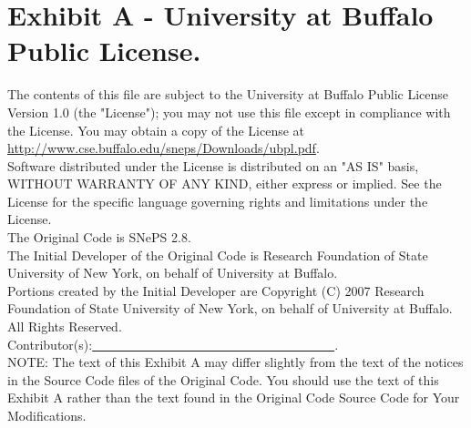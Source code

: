 \documentclass{book}
\begin{document}
\section*{Exhibit A - University at Buffalo Public License.}
The contents of this file are subject to the University at Buffalo
Public License Version 1.0 (the "License"); you may not use this
file except in compliance with the License. You may obtain a copy of
the License at \url{http://www.cse.buffalo.edu/sneps/Downloads/ubpl.pdf}.\\

\noindent Software distributed under the License is distributed on an "AS IS"
basis, WITHOUT WARRANTY OF ANY KIND, either express or implied. See the
License for the specific language governing rights and limitations
under the License.\\

\noindent The Original Code is SNePS 2.8.\\

\noindent The Initial Developer of the Original Code is Research Foundation of State University of New York, on behalf of University at Buffalo.\\

\noindent Portions created by the Initial Developer are Copyright (C) 2007 Research Foundation of State University of New York, on behalf of University at Buffalo. All Rights Reserved.\\

\noindent Contributor(s):\underline{~~~~~~~~~~~~~~~~~~~~~~~~~~~~~~~~~~~~~~}.\\

\noindent NOTE: The text of this Exhibit A may differ slightly from the text of the notices in the Source Code files of the Original Code. You should use the text of this Exhibit A rather than the text found in the Original Code Source Code for Your Modifications.

\clearpage
{}
\printindex
\end{document}
